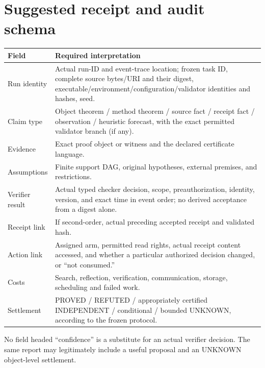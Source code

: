 \documentclass[11pt,letterpaper]{article}
\begin{document}
\section{Suggested receipt and audit schema}
\begin{small}
\begin{tabularx}{\linewidth}{@{}p{33mm}X@{}}
\toprule
Field & Required interpretation\\
\midrule
Run identity & Actual run-ID and event-trace location; frozen task ID, complete source bytes/URI and their digest, executable/environment/configuration/validator identities and hashes, seed.\\
Claim type & Object theorem / method theorem / source fact / receipt fact / observation / heuristic forecast, with the exact permitted validator branch (if any).\\
Evidence & Exact proof object or witness and the declared certificate language.\\
Assumptions & Finite support DAG, original hypotheses, external premises, and restrictions.\\
Verifier result & Actual typed checker decision, scope, preauthorization, identity, version, and exact time in event order; no derived acceptance from a digest alone.\\
Receipt link & If second-order, actual preceding accepted receipt and validated hash.\\
Action link & Assigned arm, permitted read rights, actual receipt content accessed, and whether a particular authorized decision changed, or ``not consumed.''\\
Costs & Search, reflection, verification, communication, storage, scheduling and failed work.\\
Settlement & PROVED / REFUTED / appropriately certified INDEPENDENT / conditional / bounded UNKNOWN, according to the frozen protocol.\\
\bottomrule
\end{tabularx}
\end{small}
No field headed ``confidence'' is a substitute for an actual verifier decision. The same report may legitimately include a useful proposal and an UNKNOWN object-level settlement.
\end{document}
